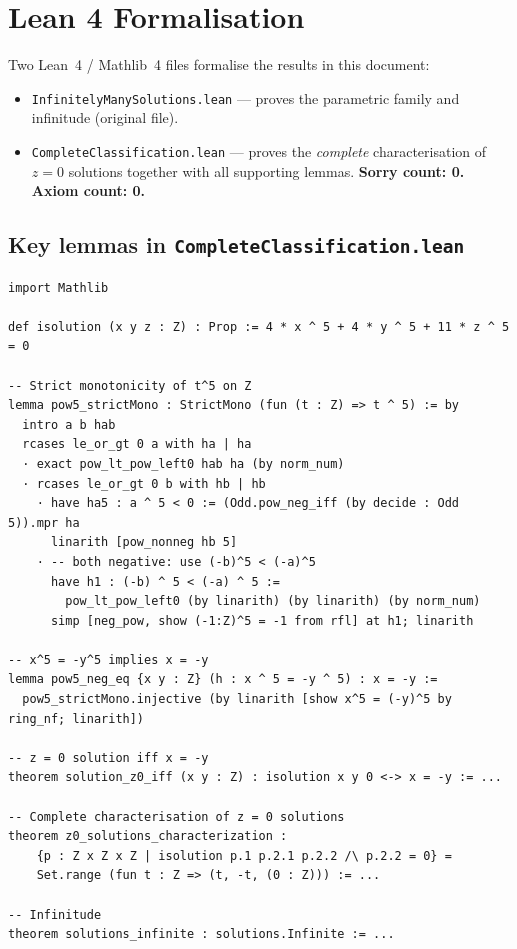 \documentclass[12pt,a4paper]{article}
\theoremstyle{definition}
\begin{document}
\section{Lean 4 Formalisation}\label{sec:lean}

Two Lean~4 / Mathlib~4 files formalise the results in this document:

\begin{itemize}
  \item \texttt{InfinitelyManySolutions.lean} — proves the parametric family and
        infinitude (original file).
  \item \texttt{CompleteClassification.lean} — proves the \emph{complete}
        characterisation of $z=0$ solutions together with all supporting lemmas.
        \textbf{Sorry count: 0.  Axiom count: 0.}
\end{itemize}

\subsection{Key lemmas in \texttt{CompleteClassification.lean}}

\begin{lstlisting}[language=Lean4]
import Mathlib

def isolution (x y z : Z) : Prop := 4 * x ^ 5 + 4 * y ^ 5 + 11 * z ^ 5 = 0

-- Strict monotonicity of t^5 on Z
lemma pow5_strictMono : StrictMono (fun (t : Z) => t ^ 5) := by
  intro a b hab
  rcases le_or_gt 0 a with ha | ha
  · exact pow_lt_pow_left0 hab ha (by norm_num)
  · rcases le_or_gt 0 b with hb | hb
    · have ha5 : a ^ 5 < 0 := (Odd.pow_neg_iff (by decide : Odd 5)).mpr ha
      linarith [pow_nonneg hb 5]
    · -- both negative: use (-b)^5 < (-a)^5
      have h1 : (-b) ^ 5 < (-a) ^ 5 :=
        pow_lt_pow_left0 (by linarith) (by linarith) (by norm_num)
      simp [neg_pow, show (-1:Z)^5 = -1 from rfl] at h1; linarith

-- x^5 = -y^5 implies x = -y
lemma pow5_neg_eq {x y : Z} (h : x ^ 5 = -y ^ 5) : x = -y :=
  pow5_strictMono.injective (by linarith [show x^5 = (-y)^5 by ring_nf; linarith])

-- z = 0 solution iff x = -y
theorem solution_z0_iff (x y : Z) : isolution x y 0 <-> x = -y := ...

-- Complete characterisation of z = 0 solutions
theorem z0_solutions_characterization :
    {p : Z x Z x Z | isolution p.1 p.2.1 p.2.2 /\ p.2.2 = 0} =
    Set.range (fun t : Z => (t, -t, (0 : Z))) := ...

-- Infinitude
theorem solutions_infinite : solutions.Infinite := ...
\end{lstlisting}
\end{document}
